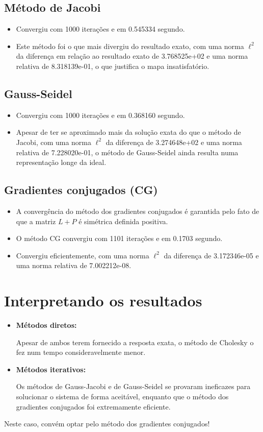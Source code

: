 \documentclass{article} %
\theoremstyle{definition}
\begin{document}
        \subsection*{Método de Jacobi}
            \begin{itemize}
                \item Convergiu com 1000 iterações e em 0.545334 segundo.
                \item Este método foi o que mais divergiu do resultado exato, com uma norma $\ell^2$ da diferença em relação ao resultado exato de 3.768525e+02 e uma norma relativa de 8.318139e-01, o que justifica o mapa insatisfatório.
            \end{itemize}
        \subsection*{Gauss-Seidel}
            \begin{itemize}
                \item Convergiu com 1000 iterações e em 0.368160 segundo.
                \item Apesar de ter se aproximado mais da solução exata do que o método de Jacobi, com uma norma $\ell^2$ da diferença de 3.274648e+02 e uma norma relativa de 7.228020e-01, o método de Gauss-Seidel ainda resulta numa representação longe da ideal.
            \end{itemize}

        \subsection*{Gradientes conjugados (CG)}
            \begin{itemize}
                \item A convergência do método dos gradientes conjugados é garantida pelo fato de que a matriz  $L + P$ é simétrica definida positiva.
                \item  O método CG convergiu com 1101 iterações e em 0.1703 segundo.
                \item Convergiu eficientemente, com uma norma $\mathcal{\ell}^2$ da diferença de 3.172346e-05 e uma norma relativa de 7.002212e-08.
            \end{itemize}

    \section*{Interpretando os resultados}
        \begin{itemize}
            \item \textbf{Métodos diretos:}

                Apesar de ambos terem fornecido a resposta exata, o método de Cholesky o fez num tempo consideravelmente menor.
            \item \textbf{Métodos iterativos:}
                
                Os métodos de Gauss-Jacobi e de Gauss-Seidel se provaram ineficazes para solucionar o sistema de forma aceitável, enquanto que o método dos gradientes conjugados foi extremamente eficiente.
        \end{itemize}

            Neste caso, convém optar pelo método dos gradientes conjugados!
            
\end{document}

